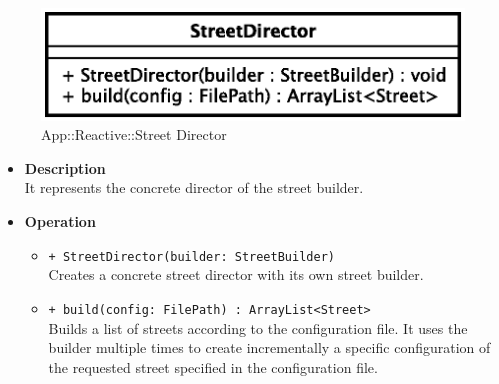 \begin{figure}[h]
\centering
\includegraphics[scale=0.6,keepaspectratio]{images/solution/street_director.eps}
\caption{App::Reactive::Street Director}
\label{fig:sd-app-street_director}
\end{figure}
\FloatBarrier
\begin{itemize}
  \item \textbf{Description} \\
    It represents the concrete director of the street builder.
  \item \textbf{Operation}
  \begin{itemize} 
    \item \texttt{+ StreetDirector(builder: StreetBuilder)} \\
Creates a concrete street director with its own street builder.
    \item \texttt{+ build(config: FilePath) : ArrayList<Street>} \\
Builds a list of streets according to the configuration file. 
It uses the builder multiple times to create incrementally a 
specific configuration of the requested street specified 
in the configuration file. 
  \end{itemize}
\end{itemize}

